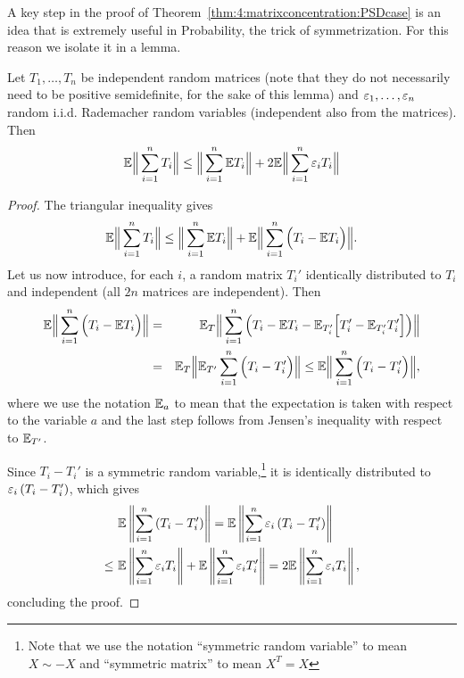 A key step in the proof of Theorem~\ref{thm:4:matrixconcentration:PSDcase} is an idea that is extremely useful in Probability, the trick of symmetrization. For this reason we isolate it in a lemma. 
\begin{lemma}[Symmetrization]\label{lemma:4:symmetrization}
Let $T_1,\dots,T_n$ be independent random matrices (note that they do not necessarily need to be positive semidefinite, for the sake of this lemma) and $\varepsilon_1,\dots,\varepsilon_n$ random i.i.d. Rademacher random variables (independent also from the matrices). Then
\[
\mathbb{E} \Big\| \sum_{i=1}^n T_i  \Big\| \leq \Big\| \sum_{i=1}^n \mathbb{E} T_i \Big\| + 2 \mathbb{E}  \Big\| \sum_{i=1}^n \varepsilon_i T_i  \Big\|
\]
\end{lemma}
\begin{proof}
The triangular inequality gives 
\[
\mathbb{E} \Big\| \sum_{i=1}^n T_i  \Big\| \leq \Big\| \sum_{i=1}^n \mathbb{E} T_i \Big\| + \mathbb{E}  \Big\| \sum_{i=1}^n  \Big(T_i - \mathbb{E} T_i\Big)  \Big\|.
\]
Let us now introduce, for each $i$, a random matrix $T_i'$ identically distributed to $T_i$ and independent (all $2n$ matrices are independent). Then
\begin{eqnarray*}
\mathbb{E}  \Big\| \sum_{i=1}^n  \Big(T_i - \mathbb{E} T_i\Big)  \Big\| & = & \mathbb{E}_T  \Big\| \sum_{i=1}^n  \Big(T_i -  \mathbb{E} T_i - \mathbb{E}_{T_i'}\Big[ T_i' - \mathbb{E}_{T_i'}T_i' \Big]\Big)  \Big\|  \\ & = & \mathbb{E}_T  \Big\| \mathbb{E}_{T'} \sum_{i=1}^n  \Big(T_i -  T_i' \Big)  \Big\| \leq \mathbb{E}  \Big\| \sum_{i=1}^n  \Big(T_i -  T_i' \Big)  \Big\|,
\end{eqnarray*}
where we use the notation $\mathbb{E}_a$ to mean that the expectation is taken with respect to the variable $a$ and the last step follows from Jensen's inequality with respect to $\mathbb{E}_{T'}$.

Since $T_i-T_i'$ is a symmetric random variable,\footnote{Note that we use the notation ``symmetric random variable'' to mean $X\sim -X$ and ``symmetric matrix'' to mean $X^T=X$} it is identically distributed to $\varepsilon_i \left( T_i - T_i' \right)$, which gives
\begin{align*}    
&\mathbb{E}  \left\| \sum_{i=1}^n  \left(T_i -  T_i' \right)  \right\|  = \mathbb{E}  \left\| \sum_{i=1}^n  \varepsilon_i\left(T_i -  T_i' \right)  \right\|  \\
 \leq \,\, & \mathbb{E}  \left\| \sum_{i=1}^n  \varepsilon_i T_i  \right\| + \mathbb{E}  \left\| \sum_{i=1}^n  \varepsilon_i T_i'  \right\| = 2 \mathbb{E}  \left\| \sum_{i=1}^n  \varepsilon_i T_i  \right\|,
\end{align*}
concluding the proof.
\end{proof}


